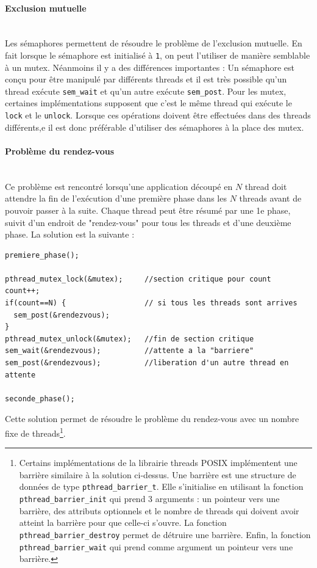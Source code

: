 \paragraph{Exclusion mutuelle}~\\
Les sémaphores permettent de résoudre le problème de l'exclusion mutuelle.
En fait lorsque le sémaphore est initialisé à \texttt{1}, on peut l'utiliser de manière semblable à un mutex.
Néanmoins il y a des différences importantes : Un sémaphore est conçu pour être manipulé par différents threads et il est très possible qu'un thread exécute \texttt{sem\_wait} et qu'un autre exécute \texttt{sem\_post}.
Pour les mutex, certaines implémentations supposent que c'est le même thread qui exécute le \texttt{lock} et le \texttt{unlock}.
Lorsque ces opérations doivent être effectuées dans des threads différents,e il est donc préférable d'utiliser des sémaphores à la place des mutex.

\paragraph{Problème du rendez-vous}~\\
Ce problème est rencontré lorsqu'une application découpé en $N$ thread doit attendre la fin de l'exécution d'une première phase dans les $N$ threads avant de pouvoir passer à la suite.
Chaque thread peut être résumé par une 1e phase, suivit d'un endroit de "rendez-vous" pour tous les threads et d'une deuxième phase.
La solution est la suivante :
\begin{lstlisting}
premiere_phase();

pthread_mutex_lock(&mutex);		//section critique pour count
count++;
if(count==N) {					// si tous les threads sont arrives
  sem_post(&rendezvous);
}
pthread_mutex_unlock(&mutex);	//fin de section critique
sem_wait(&rendezvous);			//attente a la "barriere"
sem_post(&rendezvous);			//liberation d'un autre thread en attente

seconde_phase();
\end{lstlisting}
Cette solution permet de résoudre le problème du rendez-vous avec un nombre fixe de threads\footnote{Certains implémentations de la librairie threads POSIX implémentent une barrière similaire à la solution ci-dessus.
  Une barrière est une structure de données de type \texttt{pthread\_barrier\_t}.
  Elle s'initialise en utilisant la fonction \texttt{pthread\_barrier\_init} qui prend 3 arguments : un pointeur vers une barrière, des attributs optionnels et le nombre de threads qui doivent avoir atteint la barrière pour que celle-ci s'ouvre.
  La fonction \texttt{pthread\_barrier\_destroy} permet de détruire une barrière.
Enfin, la fonction \texttt{pthread\_barrier\_wait} qui prend comme argument un pointeur vers une barrière.}.

